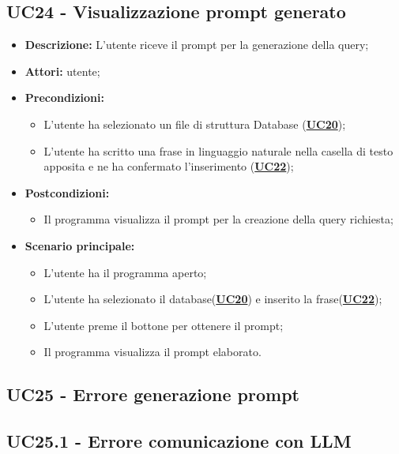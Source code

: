 \documentclass[5pt]{article}
\begin{document}
\subsection{UC24 - Visualizzazione prompt generato}
\label{sec:UC24}
\begin{itemize}
	\item \textbf{Descrizione:} L’utente riceve il prompt per la generazione della query;
	\item \textbf{Attori:} utente;
	\item \textbf{Precondizioni:} 
	\begin{itemize}
		\item L’utente ha selezionato un file di struttura Database (\hyperref[sec:UC20]{\textbf{UC20}});
		\item L’utente ha scritto una frase in linguaggio naturale nella casella di testo apposita e ne ha confermato l’inserimento (\hyperref[sec:UC22]{\textbf{UC22}});
	\end{itemize}
	\item \textbf{Postcondizioni:} 
	\begin{itemize}
		\item Il programma visualizza il prompt per la creazione della query richiesta;
	\end{itemize}
	\item \textbf{Scenario principale:} 
	\begin{itemize}
		\item L’utente ha il programma aperto;
		\item L’utente ha selezionato il database(\hyperref[sec:UC20]{\textbf{UC20}}) e inserito la frase(\hyperref[sec:UC22]{\textbf{UC22}});
		\item L’utente preme il bottone per ottenere il prompt;
		\item Il programma visualizza il prompt elaborato.
	\end{itemize}
\end{itemize}

\subsection{UC25 - Errore generazione prompt}
\label{sec:UC25}

\subsection{UC25.1 - Errore comunicazione con LLM}
\label{sec:UC25.1}
\end{document}
